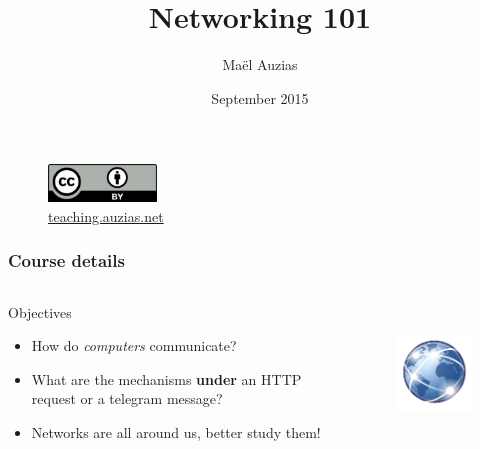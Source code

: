 \documentclass[]{beamer}
\title{Networking 101}
\author{Maël Auzias}
\institute{ENSIBS - UBS}
\date{September 2015}
\begin{document}
\begin{frame}
  \titlepage
  \begin{figure}[p]
      \centering
      \includegraphics[height=1cm]{./imgs/cc40.jpg}
      \caption{\color{blue}\href{http://teaching.auzias.net}{teaching.auzias.net}}
    \label{fig:cc40}
  \end{figure}
\end{frame}


  \begin{frame}
    \frametitle{Course details}
    \begin{columns}
        \begin{block}{Objectives}
          \begin{itemize}
            \item How do \emph{computers} communicate?
            \item What are the mechanisms \textbf{under} an HTTP request or a telegram message?
            \item Networks are all around us, better study them!
          \end{itemize}
        \end{block}
        \begin{figure}[t]
          \centering
          \includegraphics[height=3cm]{./imgs/ntwks.pdf}
          \label{fig:ntwks}
        \end{figure}
    \end{columns}
  \end{frame}
\end{document}
